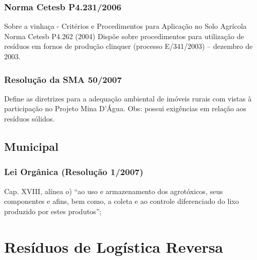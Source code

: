 \begin{subapend}
\begin{subsubapend}
		\subsubsection{Norma Cetesb P4.231/2006}
		Sobre a vinhaça - Critérios e Procedimentos para Aplicação no Solo Agrícola Norma Cetesb P4.262 (2004) Dispõe sobre procedimentos para utilização de resíduos em fornos de produção clinquer (processo E/341/2003) – dezembro de 2003.
		\subsubsection{Resolução da SMA 50/2007}
		Define as diretrizes para a adequação ambiental de imóveis rurais com vistas à participação no Projeto Mina D’Água. Obs: possui exigências em relação aos resíduos sólidos.
	\end{subsubapend}
\end{subapend}

\begin{subapend}
\subsection{Municipal}	
	\begin{subsubapend}
		\item \subsubsection{Lei Orgânica (Resolução 1/2007)}
		Cap. XVIII, alínea o) “ao uso e armazenamento dos agrotóxicos, seus componentes e afins, bem como, a coleta e ao controle diferenciado do lixo produzido por estes produtos”;   
	\end{subsubapend}
\end{subapend}

\section{Resíduos de Logística Reversa}

